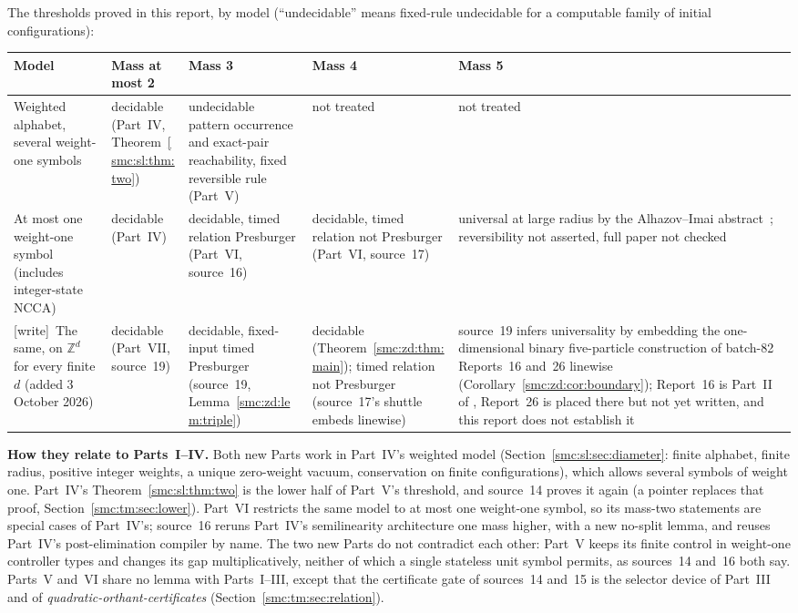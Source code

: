 \documentclass[11pt,letterpaper]{article}
\numberwithin{equation}{section}
\theoremstyle{definition}
\theoremstyle{remark}
\newcommand{\Z}{\mathbb Z}
\newcommand{\wtag}{\textup{[write]}}
\begin{document}
The thresholds proved in this report, by model (``undecidable'' means fixed-rule undecidable for a computable family of initial configurations):

\begin{center}
\small
\begin{tabular}{@{}L{0.23\textwidth}L{0.15\textwidth}L{0.19\textwidth}L{0.12\textwidth}L{0.16\textwidth}@{}}
\toprule
Model & Mass at most 2 & Mass 3 & Mass 4 & Mass 5\\
\midrule
Weighted alphabet, several weight-one symbols & decidable (Part~IV, Theorem~\ref{smc:sl:thm:two}) & undecidable pattern occurrence and exact-pair reachability, fixed reversible rule (Part~V) & not treated & not treated\\
At most one weight-one symbol (includes integer-state NCCA) & decidable (Part~IV) & decidable, timed relation Presburger (Part~VI, source~16) & decidable, timed relation not Presburger (Part~VI, source~17) & universal at large radius by the Alhazov--Imai abstract~\cite{alhazovimai}; reversibility not asserted, full paper not checked\\
\wtag\ The same, on $\Z^d$ for every finite $d$ (added 3 October 2026) & decidable (Part~VII, source~19) & decidable, fixed-input timed Presburger (source~19, Lemma~\ref{smc:zd:lem:triple}) & decidable (Theorem~\ref{smc:zd:thm:main}); timed relation not Presburger (source~17's shuttle embeds linewise) & source~19 infers universality by embedding the one-dimensional binary five-particle construction of batch-82 Reports~16 and~26 linewise (Corollary~\ref{smc:zd:cor:boundary}); Report~16 is Part~II of , Report~26 is placed there but not yet written, and this report does not establish it\\
\bottomrule
\end{tabular}
\end{center}

\textbf{How they relate to Parts~I--IV.} Both new Parts work in Part~IV's weighted model (Section~\ref{smc:sl:sec:diameter}: finite alphabet, finite radius, positive integer weights, a unique zero-weight vacuum, conservation on finite configurations), which allows several symbols of weight one. Part~IV's Theorem~\ref{smc:sl:thm:two} is the lower half of Part~V's threshold, and source~14 proves it again (a pointer replaces that proof, Section~\ref{smc:tm:sec:lower}). Part~VI restricts the same model to at most one weight-one symbol, so its mass-two statements are special cases of Part~IV's; source~16 reruns Part~IV's semilinearity architecture one mass higher, with a new no-split lemma, and reuses Part~IV's post-elimination compiler by name. The two new Parts do not contradict each other: Part~V keeps its finite control in weight-one controller types and changes its gap multiplicatively, neither of which a single stateless unit symbol permits, as sources~14 and~16 both say. Parts~V and~VI share no lemma with Parts~I--III, except that the certificate gate of sources~14 and~15 is the selector device of Part~III and of \emph{quadratic-orthant-certificates} (Section~\ref{smc:tm:sec:relation}).
\end{document}

